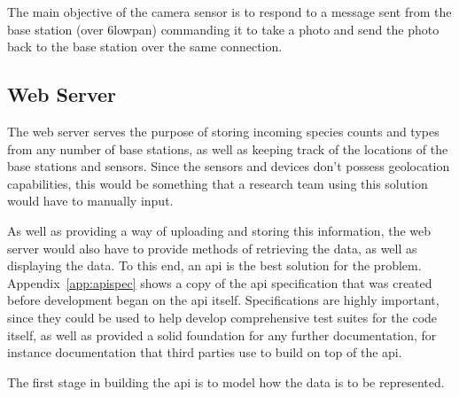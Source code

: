 The main objective of the camera sensor is to respond to a message sent from
the base station (over \gls{6lowpan}) commanding it to take a photo and send
the photo back to the base station over the same connection.

\subsection{Web Server}
The web server serves the purpose of storing incoming species counts and
types from any number of base stations, as well as keeping track of the
locations of the base stations and sensors. Since the sensors and devices
don't possess geolocation capabilities, this would be something that a
research team using this solution would have to manually input.

As well as providing a way of uploading and storing this information, the web
server would also have to provide methods of retrieving the data, as well as
displaying the data. To this end, an \acrshort{api} is the best solution for
the problem. Appendix~\ref{app:apispec} shows a copy of the \acrshort{api}
specification that was created before development began on the \acrshort{api}
itself. Specifications are highly important, since they could be used to help
develop comprehensive test suites for the code itself, as well as provided a
solid foundation for any further documentation, for instance documentation
that third parties use to build on top of the \acrshort{api}.

The first stage in building the \acrshort{api} is to model how the data is to
be represented.